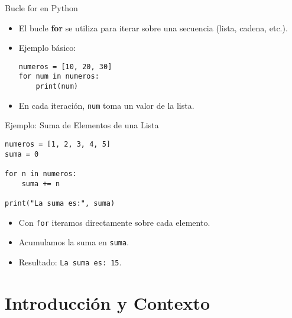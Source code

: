 \documentclass[10pt]{beamer}
\begin{document}
\begin{frame}[fragile]{Bucle for en Python}
  \begin{itemize}
    \item El bucle \textbf{for} se utiliza para iterar sobre una secuencia (lista, cadena, etc.).
    \item Ejemplo básico:
    \begin{verbatim}
numeros = [10, 20, 30]
for num in numeros:
    print(num)
    \end{verbatim}
    \item En cada iteración, \texttt{num} toma un valor de la lista.
  \end{itemize}
\end{frame}

\begin{frame}[fragile]{Ejemplo: Suma de Elementos de una Lista}
  \begin{verbatim}
numeros = [1, 2, 3, 4, 5]
suma = 0

for n in numeros:
    suma += n

print("La suma es:", suma)
  \end{verbatim}
  \begin{itemize}
    \item Con \texttt{for} iteramos directamente sobre cada elemento.
    \item Acumulamos la suma en \texttt{suma}.
    \item Resultado: \texttt{La suma es: 15}.
  \end{itemize}
\end{frame}



\section{Introducción y Contexto}
\end{document}
